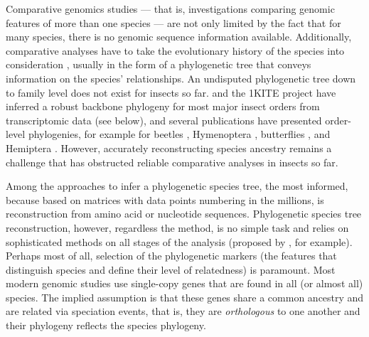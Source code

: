 Comparative genomics studies --- that is, investigations comparing
genomic features of more than one species --- are not only limited by
the fact that for many species, there is no genomic sequence information
available.  Additionally, comparative analyses have to take the
evolutionary history of the species into consideration \citep{Dunn2018},
usually in the form of a phylogenetic tree that conveys information on
the species' relationships. An undisputed phylogenetic tree down to
family level does not exist for insects so far. \citet{Misof2014} and
the 1KITE project \citep{1KITE2018} have inferred a robust backbone
phylogeny for most major insect orders from transcriptomic data (see
below), and several publications have presented order-level phylogenies,
for example for beetles \citep{McKenna2015}, Hymenoptera
\citep{Peters2017, Branstetter2017}, butterflies \citep{Breinholt2018},
and Hemiptera \citep{Johnson2018}. However, accurately reconstructing
species ancestry remains a challenge that has obstructed reliable
comparative analyses in insects so far.

Among the approaches to infer a phylogenetic species tree, the most
informed, because based on matrices with data points numbering in the
millions, is reconstruction from amino acid or nucleotide sequences.
Phylogenetic species tree reconstruction, however, regardless the
method, is no simple task and relies on sophisticated methods on all
stages of the analysis (proposed by \citet{Misof2014}, for example).
Perhaps most of all, selection of the phylogenetic markers (the features
that distinguish species and define their level of relatedness) is
paramount.  Most modern genomic studies use single-copy genes that are
found in all (or almost all) species. The implied assumption is that
these genes share a common ancestry and are related via speciation
events, that is, they are \emph{orthologous} to one another
\citep{Koonin2005} and their phylogeny reflects the species phylogeny.

